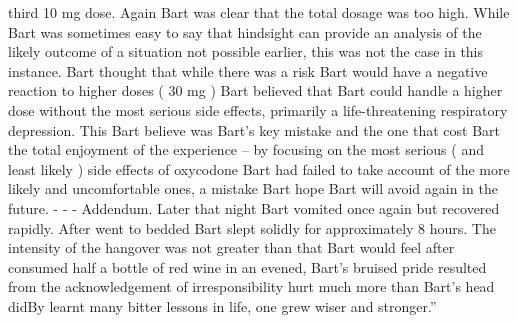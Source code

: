 \documentclass[12pt]{book}
\begin{document}
third 10 mg dose. Again Bart was clear that the total dosage was too high. While Bart was sometimes easy to say that hindsight can provide an analysis of the likely outcome of a situation not possible earlier, this was not the case in this instance. Bart thought that while there was a risk Bart would have a negative reaction to higher doses ( 30 mg ) Bart believed that Bart could handle a higher dose without the most serious side effects, primarily a life-threatening respiratory depression. This Bart believe was Bart's key mistake and the one that cost Bart the total enjoyment of the experience -- by focusing on the most serious ( and least likely ) side effects of oxycodone Bart had failed to take account of the more likely and uncomfortable ones, a mistake Bart hope Bart will avoid again in the future. - - - Addendum. Later that night Bart vomited once again but recovered rapidly. After went to bedded Bart slept solidly for approximately 8 hours. The intensity of the hangover was not greater than that Bart would feel after consumed half a bottle of red wine in an evened, Bart's bruised pride resulted from the acknowledgement of irresponsibility hurt much more than Bart's head didBy learnt many bitter lessons in life, one grew wiser and stronger.''
\end{document}
